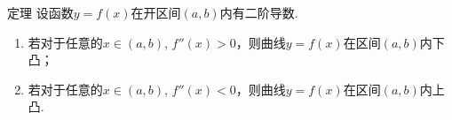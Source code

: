\begin{example}
    
\end{example}

\begin{solution}
    
\end{solution}




\begin{example}
    
\end{example}

\begin{solution}
    
\end{solution}




\begin{example}
    
\end{example}

\begin{solution}
    
\end{solution}





\begin{example}
    
\end{example}

\begin{solution}
    
\end{solution}




\begin{example}
    
\end{example}

\begin{solution}
    
\end{solution}


\begin{thm}
{定理} 设函数$y=f(x)$在开区间$(a,b)$内有二阶导数.
\begin{enumerate}[(1)]
\item 若对于任意的$x\in (a,b)$, $f''(x)>0$，则曲线$y=f(x)$在区间$(a,b)$内下凸；
\item 若对于任意的$x\in (a,b)$, $f''(x)<0$，则曲线$y=f(x)$在区间$(a,b)$内上凸.  
\end{enumerate}
\end{thm}

